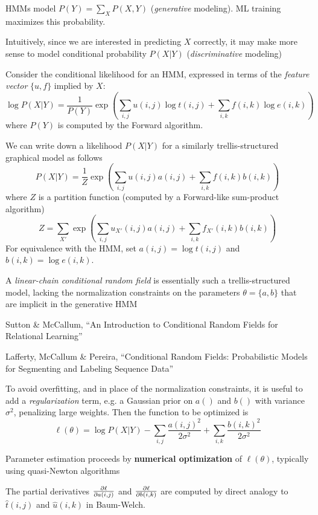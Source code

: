 \documentclass{beamer}
\begin{document}
\begin{frame}{}

\itemb
\item HMMs model $P(Y) = \sum_X P(X,Y)$ ({\em generative} modeling). ML training maximizes this probability.
\item Intuitively, since we are interested in predicting $X$ correctly, it may make more sense to model conditional probability $P(X|Y)$ ({\em discriminative} modeling)
\item Consider the conditional likelihood for an HMM, expressed in terms of the {\em feature vector} $\{u,f\}$ implied by $X$:
\[
\log P(X|Y) = \frac{1}{P(Y)} \exp \left( \sum_{i,j} u(i,j) \log t(i,j) + \sum_{i,k} f(i,k) \log e(i,k) \right)
\]
where $P(Y)$ is computed by the Forward algorithm.
\item We can write down a likelihood $P(X|Y)$ for a similarly trellis-structured graphical model as follows
\[
P(X|Y) = \frac{1}{Z} \exp \left( \sum_{i,j} u(i,j) a(i,j) + \sum_{i,k} f(i,k) b(i,k) \right)
\]
where $Z$ is a partition function (computed by a Forward-like sum-product algorithm)
\[
Z = \sum_{X'} \exp \left( \sum_{i,j} u_{X'}(i,j) a(i,j) + \sum_{i,k} f_{X'}(i,k) b(i,k) \right)
\]
For equivalence with the HMM, set $a(i,j)=\log t(i,j)$ and $b(i,k)=\log e(i,k)$.
\item A {\em linear-chain conditional random field} is essentially such a trellis-structured model,
lacking the normalization constraints on the parameters $\theta=\{a,b\}$ that are implicit in the generative HMM
 \itemb
 \item Sutton \& McCallum, ``An Introduction to Conditional Random Fields for Relational Learning''
 \item Lafferty, McCallum \& Pereira, ``Conditional Random Fields: Probabilistic Models for Segmenting and Labeling Sequence Data''
 \iteme
\item To avoid overfitting, and in place of the normalization constraints,
it is useful to add a {\em regularization} term, e.g. a Gaussian prior on $a()$ and $b()$ with variance $\sigma^2$, penalizing large weights.
Then the function to be optimized is
\[
\ell(\theta) = \log P(X|Y) - \sum_{i,j} \frac{a(i,j)^2}{2\sigma^2} + \sum_{i,k} \frac{b(i,k)^2}{2\sigma^2}
\]
\item Parameter estimation proceeds by {\bf numerical optimization} of $\ell(\theta)$, typically using quasi-Newton algorithms
\item The partial derivatives $\frac{\partial {\ell}}{\partial {a(i,j)}}$ and $\frac{\partial {\ell}}{\partial {b(i,k)}}$ are computed by direct analogy to $\hat{t}(i,j)$ and $\hat{u}(i,k)$ in Baum-Welch.

\end{frame}
\end{document}
